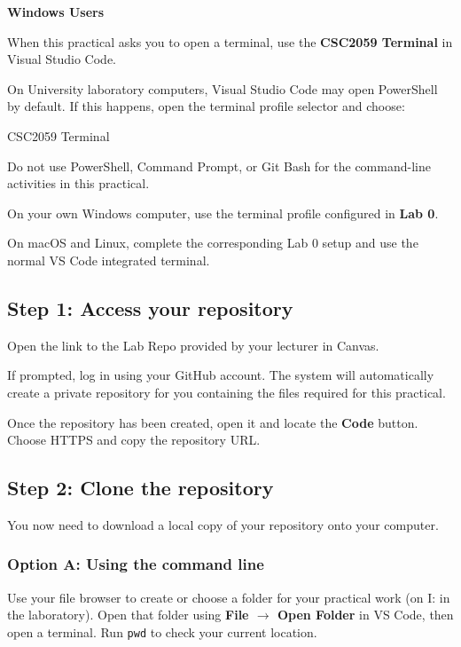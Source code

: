 \documentclass{csc2059practical}
\begin{document}
\begin{importantnote}
\textbf{Windows Users}\par
\medskip

When this practical asks you to open a terminal, use the \textbf{CSC2059 Terminal} in Visual Studio Code.

On University laboratory computers, Visual Studio Code may open PowerShell by default. If this happens, open the terminal profile selector and choose:

\begin{terminal}
CSC2059 Terminal
\end{terminal}

Do not use PowerShell, Command Prompt, or Git Bash for the command-line activities in this practical.

On your own Windows computer, use the terminal profile configured in \textbf{Lab 0}.
\end{importantnote}

On macOS and Linux, complete the corresponding Lab 0 setup and use the normal VS Code integrated terminal.

\subsection{Step 1: Access your repository}

Open the link to the Lab Repo provided by your lecturer in Canvas.

If prompted, log in using your GitHub account. The system will automatically create a private repository for you containing the files required for this practical.

Once the repository has been created, open it and locate the \textbf{Code} button. Choose HTTPS and copy the repository URL.

\subsection{Step 2: Clone the repository}

You now need to download a local copy of your repository onto your computer.

\subsubsection{Option A: Using the command line}

Use your file browser to create or choose a folder for your practical work (on I: in the laboratory). Open that folder using \textbf{File $\rightarrow$ Open Folder} in VS Code, then open a terminal. Run \texttt{pwd} to check your current location.
\end{document}
